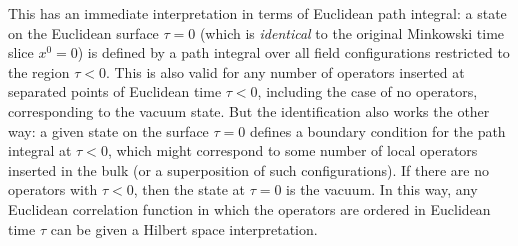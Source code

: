 \documentclass[a4paper,12pt]{article}
\numberwithin{equation}{section}
\begin{document}
This has an immediate interpretation in terms of Euclidean path integral: 
a state on the Euclidean surface $\tau = 0$ (which is \emph{identical} to the original Minkowski time slice $x^0 = 0$) is defined by a path integral over all field configurations restricted to the region $\tau < 0$. This is also valid for any number of operators inserted at separated points of Euclidean time $\tau < 0$, including the case of no operators, corresponding to the vacuum state. But the identification also works the other way: a given state on the surface $\tau = 0$ defines a boundary condition for the path integral at $\tau < 0$, which might correspond to some number of local operators inserted in the bulk (or a superposition of such configurations). If there are no operators with $\tau < 0$, then the state at $\tau = 0$ is the vacuum.
In this way, any Euclidean correlation function in which the operators are ordered in Euclidean time $\tau$ can be given a Hilbert space interpretation.
\end{document}
